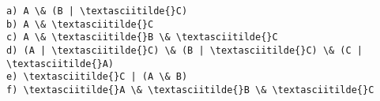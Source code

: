 \documentclass[11pt]{article}
\begin{document}
    \begin{Verbatim}[commandchars=\\\{\}]
a) A \& (B | \textasciitilde{}C)
b) A \& \textasciitilde{}C
c) A \& \textasciitilde{}B \& \textasciitilde{}C
d) (A | \textasciitilde{}C) \& (B | \textasciitilde{}C) \& (C | \textasciitilde{}A)
e) \textasciitilde{}C | (A \& B)
f) \textasciitilde{}A \& \textasciitilde{}B \& \textasciitilde{}C
    \end{Verbatim}


    
    
    
\end{document}
